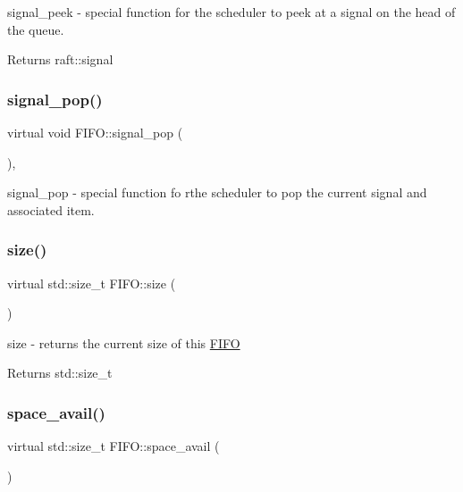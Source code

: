signal\+\_\+peek -\/ special function for the scheduler to peek at a signal on the head of the queue. \begin{DoxyReturn}{Returns}
raft\+::signal 
\end{DoxyReturn}
\hypertarget{class_f_i_f_o_ad6b606d47361489007490e0e0b4e2aa1}{}\label{class_f_i_f_o_ad6b606d47361489007490e0e0b4e2aa1} 
\subsubsection{\texorpdfstring{signal\+\_\+pop()}{signal\_pop()}}
{\footnotesize\ttfamily virtual void F\+I\+F\+O\+::signal\+\_\+pop (\begin{DoxyParamCaption}{ }\end{DoxyParamCaption})\hspace{0.3cm}{\ttfamily [protected]}, {}}

signal\+\_\+pop -\/ special function fo rthe scheduler to pop the current signal and associated item. \hypertarget{class_f_i_f_o_ae80b8555fc249168560c67cd0a13e574}{}\label{class_f_i_f_o_ae80b8555fc249168560c67cd0a13e574} 
\subsubsection{\texorpdfstring{size()}{size()}}
{\footnotesize\ttfamily virtual std\+::size\+\_\+t F\+I\+F\+O\+::size (\begin{DoxyParamCaption}{ }\end{DoxyParamCaption})\hspace{0.3cm}{\ttfamily [pure virtual]}}

size -\/ returns the current size of this \hyperlink{class_f_i_f_o}{F\+I\+FO} \begin{DoxyReturn}{Returns}
std\+::size\+\_\+t 
\end{DoxyReturn}
\hypertarget{class_f_i_f_o_ac34aa9afd24e536aad0a9553863b6fe6}{}\label{class_f_i_f_o_ac34aa9afd24e536aad0a9553863b6fe6} 
\subsubsection{\texorpdfstring{space\+\_\+avail()}{space\_avail()}}
{\footnotesize\ttfamily virtual std\+::size\+\_\+t F\+I\+F\+O\+::space\+\_\+avail (\begin{DoxyParamCaption}{ }\end{DoxyParamCaption})\hspace{0.3cm}{\ttfamily [pure virtual]}}

